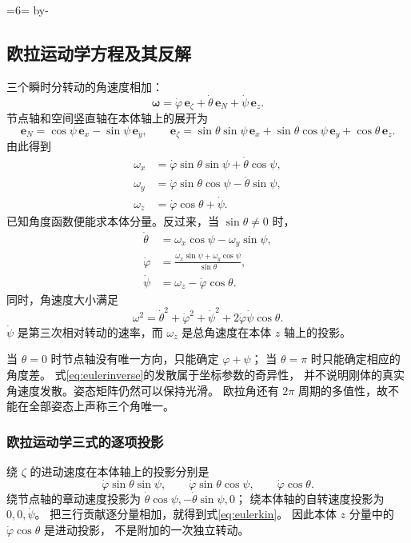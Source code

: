 \documentclass[UTF8,zihao=-4,fontset=fandol,a4paper]{ctexart}
\makeatletter
\newcommand{\vect}[1]{\bm{#1}}
\newcommand{\Needspace}[1]{\par\if@nobreak\else\penalty0\begingroup\dimen0=#1\relax\dimen2=\pagegoal\advance\dimen2 by-\pagetotal\ifdim\dimen0>\dimen2\newpage\fi\endgroup\fi}
\let\SavedSubsection\subsection
\renewcommand{\subsection}{\Needspace{6\baselineskip}\SavedSubsection}
\makeatother
\begin{document}
\subsection{欧拉运动学方程及其反解}\label{sub:c3-3.2}
三个瞬时分转动的角速度相加：
\[
\vect\omega=\dot\varphi\,\vect e_\zeta
+\dot\theta\,\vect e_N+\dot\psi\,\vect e_z.
\]
节点轴和空间竖直轴在本体轴上的展开为
\[
\vect e_N=\cos\psi\,\vect e_x-\sin\psi\,\vect e_y,\qquad
\vect e_\zeta=\sin\theta\sin\psi\,\vect e_x
+\sin\theta\cos\psi\,\vect e_y+\cos\theta\,\vect e_z.
\]
由此得到
\begin{equation}\label{eq:eulerkin}
\begin{aligned}
\omega_x&=\dot\varphi\sin\theta\sin\psi+\dot\theta\cos\psi,\\
\omega_y&=\dot\varphi\sin\theta\cos\psi-\dot\theta\sin\psi,\\
\omega_z&=\dot\varphi\cos\theta+\dot\psi.
\end{aligned}
\end{equation}
已知角度函数便能求本体分量。反过来，当 $\sin\theta\ne0$ 时，
\begin{equation}\label{eq:eulerinverse}
\begin{aligned}
\dot\theta&=\omega_x\cos\psi-\omega_y\sin\psi,\\
\dot\varphi&=\frac{\omega_x\sin\psi+\omega_y\cos\psi}{\sin\theta},\\
\dot\psi&=\omega_z-\dot\varphi\cos\theta.
\end{aligned}
\end{equation}
同时，角速度大小满足
\[
\omega^2=\dot\theta^2+\dot\varphi^2+\dot\psi^2
+2\dot\varphi\dot\psi\cos\theta.
\]
$\dot\psi$ 是第三次相对转动的速率，而 $\omega_z$ 是总角速度在本体 $z$ 轴上的投影。

当 $\theta=0$ 时节点轴没有唯一方向，只能确定 $\varphi+\psi$；
当 $\theta=\pi$ 时只能确定相应的角度差。
式\eqref{eq:eulerinverse}的发散属于坐标参数的奇异性，
并不说明刚体的真实角速度发散。姿态矩阵仍然可以保持光滑。
欧拉角还有 $2\pi$ 周期的多值性，故不能在全部姿态上声称三个角唯一。


\subsubsection*{欧拉运动学三式的逐项投影}
绕 $\zeta$ 的进动速度在本体轴上的投影分别是
\[
\dot\varphi\sin\theta\sin\psi,\qquad
\dot\varphi\sin\theta\cos\psi,\qquad
\dot\varphi\cos\theta.
\]
绕节点轴的章动速度投影为
$\dot\theta\cos\psi,-\dot\theta\sin\psi,0$；
绕本体轴的自转速度投影为 $0,0,\dot\psi$。
把三行贡献逐分量相加，就得到式\eqref{eq:eulerkin}。
因此本体 $z$ 分量中的 $\dot\varphi\cos\theta$ 是进动投影，
不是附加的一次独立转动。
\end{document}

